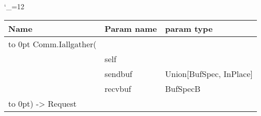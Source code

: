 \begingroup \catcode`\_=12 \tt
\begin{tabular}{lll}
\toprule
\textrm{Name}&\textrm{Param name}&\textrm{param type}\\
\midrule
\hbox to 0pt {Comm.Iallgather(\hss}\\
& self\\
& sendbuf & Union[BufSpec, InPlace]\\
& recvbuf & BufSpecB\\
\hbox to 0pt{) -> Request\hss}\\
\bottomrule
\end{tabular}
\endgroup
